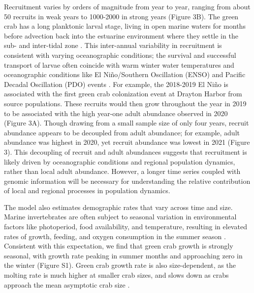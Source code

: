 \documentclass{article}
\begin{document}
Recruitment varies by orders of magnitude from year to year, ranging from about 50 recruits in weak years to 1000-2000 in strong years (Figure 3B). The green crab has a long planktonic larval stage, living in open marine waters for months before advection back into the estuarine environment where they settle in the sub- and inter-tidal zone \parencite{yamada2001global}. This inter-annual variability in recruitment is consistent with varying oceanographic conditions; the survival and successful transport of larvae often coincide with warm winter water temperatures and oceanographic conditions like El Niño/Southern Oscillation (ENSO) and Pacific Decadal Oscillation (PDO) events \parencite{yamada2021ocean}. For example, the 2018-2019 El Niño is associated with the first green crab colonization event at Drayton Harbor from source populations. These recruits would then grow throughout the year in 2019 to be associated with the high year-one adult abundance observed in 2020 (Figure 3A). Though drawing from a small sample size of only four years, recruit abundance appears to be decoupled from adult abundance; for example, adult abundance was highest in 2020, yet recruit abundance was lowest in 2021 (Figure 3). This decoupling of recruit and adult abundances suggests that recruitment is likely driven by oceanographic conditions and regional population dynamics, rather than local adult abundance. However, a longer time series coupled with genomic information will be necessary for understanding the relative contribution of local and regional processes in population dynamics.

The model also estimates demographic rates that vary across time and size. Marine invertebrates are often subject to seasonal variation in environmental factors like photoperiod, food availability, and temperature, resulting in elevated rates of growth, feeding, and oxygen consumption in the summer season \parencite{brockington2001relative}. Consistent with this expectation, we find that green crab growth is strongly seasonal, with growth rate peaking in summer months and approaching zero in the winter (Figure S1). Green crab growth rate is also size-dependent, as the molting rate is much higher at smaller crab sizes, and slows down as crabs approach the mean asymptotic crab size \parencite{yamada2005growth}.
\end{document}
